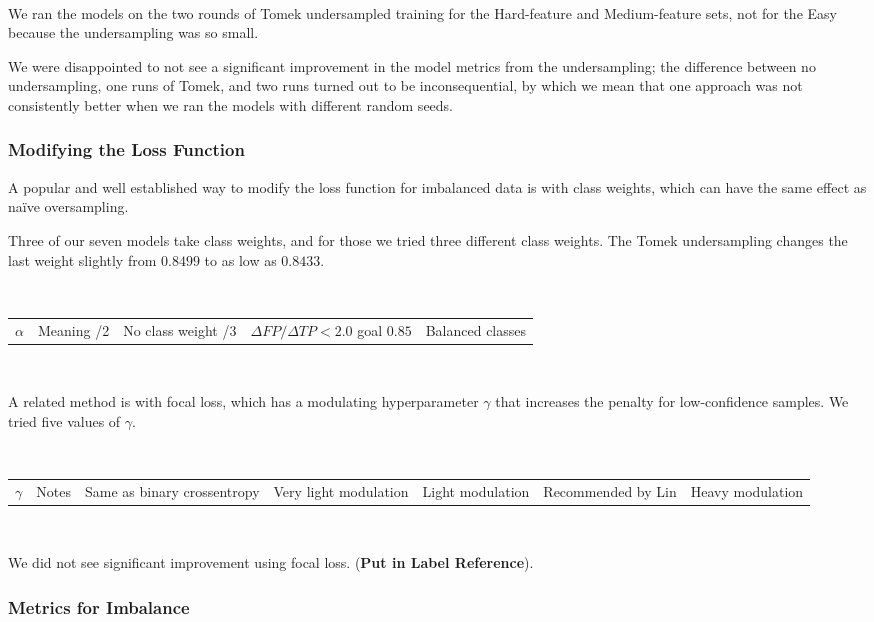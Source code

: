 \

We ran the models on the two rounds of Tomek undersampled training for the Hard-feature and Medium-feature sets, not for the Easy because the undersampling was so small.  

We were disappointed to not see a significant improvement in the model metrics from the undersampling; the difference between no undersampling, one runs of Tomek, and two runs turned out to be inconsequential, by which we mean that one approach was not consistently better when we ran the models with different random seeds.  


\subsubsection{Modifying the Loss Function}

A popular and well established way to modify the loss function for imbalanced data is with class weights, which can have the same effect as na{\"i}ve oversampling.  

Three of our seven models take class weights, and for those we tried three different class weights.  The Tomek undersampling changes the last weight slightly from $0.8499$ to as low as $0.8433$.

\

\hfil\begin{tabular}{c|l}
	$\alpha$ & Meaning \cr{}/2 & No class weight /3 & $\Delta FP/\Delta TP < 2.0$ goal \cr
	$0.85$ & Balanced classes \cr 
\end{tabular}

\


A related method is with focal loss, which has a modulating hyperparameter $\gamma$ that increases the penalty for low-confidence samples. \citep{lin2017focal}  We tried five values  of $\gamma$.

\

\hfil\begin{tabular}{c|c}
	$\gamma$  & Notes \cr{} & Same as binary crossentropy  & Very light modulation  & Light modulation & Recommended by Lin  & Heavy modulation \cr
\end{tabular}	

\

We did not see significant improvement using focal loss.  ({\bf Put in Label Reference}).

\subsubsection{Metrics for Imbalance}


